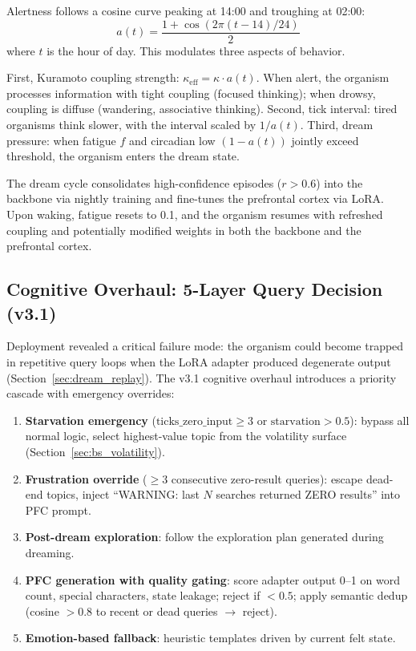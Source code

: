 \documentclass[11pt,a4paper,twocolumn]{article}
\begin{document}
Alertness follows a cosine curve peaking at 14:00 and troughing at 02:00:
\begin{equation}
a(t) = \frac{1 + \cos(2\pi(t - 14)/24)}{2}
\label{eq:circadian}
\end{equation}
where $t$ is the hour of day.
This modulates three aspects of behavior.

First, Kuramoto coupling strength: $\kappa_{\mathrm{eff}} = \kappa \cdot a(t)$.
When alert, the organism processes information with tight coupling (focused thinking); when drowsy, coupling is diffuse (wandering, associative thinking).
Second, tick interval: tired organisms think slower, with the interval scaled by $1/a(t)$.
Third, dream pressure: when fatigue $f$ and circadian low $(1 - a(t))$ jointly exceed threshold, the organism enters the dream state.

The dream cycle consolidates high-confidence episodes ($r > 0.6$) into the backbone via nightly training and fine-tunes the prefrontal cortex via LoRA.
Upon waking, fatigue resets to 0.1, and the organism resumes with refreshed coupling and potentially modified weights in both the backbone and the prefrontal cortex.

\subsection{Cognitive Overhaul: 5-Layer Query Decision (v3.1)}

Deployment revealed a critical failure mode: the organism could become trapped in repetitive query loops when the LoRA adapter produced degenerate output (Section~\ref{sec:dream_replay}).
The v3.1 cognitive overhaul introduces a priority cascade with emergency overrides:

\begin{enumerate}
\item \textbf{Starvation emergency} ($\text{ticks\_zero\_input} \geq 3$ or $\text{starvation} > 0.5$): bypass all normal logic, select highest-value topic from the volatility surface (Section~\ref{sec:bs_volatility}).
\item \textbf{Frustration override} ($\geq 3$ consecutive zero-result queries): escape dead-end topics, inject ``WARNING: last $N$ searches returned ZERO results'' into PFC prompt.
\item \textbf{Post-dream exploration}: follow the exploration plan generated during dreaming.
\item \textbf{PFC generation with quality gating}: score adapter output 0--1 on word count, special characters, state leakage; reject if $< 0.5$; apply semantic dedup (cosine $> 0.8$ to recent or dead queries $\to$ reject).
\item \textbf{Emotion-based fallback}: heuristic templates driven by current felt state.
\end{enumerate}
\end{document}

